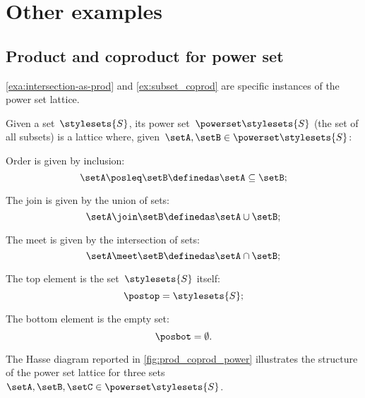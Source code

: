 

\section{Other examples}

\subsection{Product and coproduct for power set}
\cref{exa:intersection-as-prod} and \cref{ex:subset_coprod} are specific instances of the power set lattice.

\begin{definition}
    \label{def:power-set-as-lattice}
    Given a set~$\stylesets{S}$, its power set~$\powerset \stylesets{S}$ (the set of all subsets) is a lattice where, given~$\setA,\setB\in \powerset \stylesets{S}$:
    \begin{compactitem}
        \item Order is given by inclusion:
        \begin{equation*}
            \setA\posleq \setB \definedas \setA\subseteq \setB;
        \end{equation*}
        \item The join is given by the union of sets:
        \begin{equation*}
            \setA\join \setB \definedas \setA\cup \setB;
        \end{equation*}
        \item The meet is given by the intersection of sets:
        \begin{equation*}
            \setA\meet \setB \definedas \setA\cap \setB;
        \end{equation*}
        \item The top element is the set~$\stylesets{S}$ itself:
        \begin{equation*}
            \postop = \stylesets{S};
        \end{equation*}
        \item The bottom element is the empty set:
        \begin{equation*}
            \posbot = \emptyset.
        \end{equation*}
    \end{compactitem}
\end{definition}

The Hasse diagram reported in \cref{fig:prod_coprod_power} illustrates the structure of the power set lattice for three sets~$\setA,\setB,\setC\in \powerset \stylesets{S}$.

